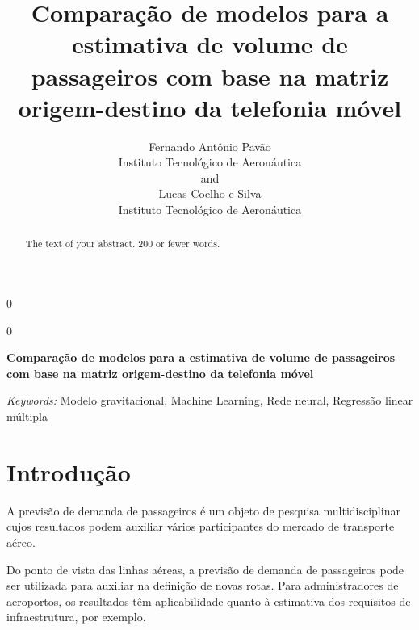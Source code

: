 \documentclass[12pt]{article}
\newcommand{\blind}{0}
\begin{document}
\def\spacingset#1{\renewcommand{\baselinestretch}%
{#1}\small\normalsize} \spacingset{1}



\blind
{
  \title{\bf Comparação de modelos para a estimativa de volume de passageiros com
base na matriz origem-destino da telefonia móvel}

  \author{
        Fernando Antônio Pavão \\
    Instituto Tecnológico de Aeronáutica\\
     and \\     Lucas Coelho e Silva \\
    Instituto Tecnológico de Aeronáutica\\
      }
  \maketitle
} \fi

\blind
{
  \bigskip
  \bigskip
  \bigskip
  \begin{center}
    {\LARGE\bf Comparação de modelos para a estimativa de volume de passageiros com
base na matriz origem-destino da telefonia móvel}
  \end{center}
  \medskip
} \fi

\bigskip
\begin{abstract}
The text of your abstract. 200 or fewer words.
\end{abstract}

\noindent%
{\it Keywords:} Modelo gravitacional, Machine Learning, Rede neural, Regressão linear múltipla
\vfill

\newpage
\spacingset{1.45} %

\hypertarget{introduuxe7uxe3o}{%
\section{Introdução}\label{introduuxe7uxe3o}}

A previsão de demanda de passageiros é um objeto de pesquisa
multidisciplinar cujos resultados podem auxiliar vários participantes do
mercado de transporte aéreo.

Do ponto de vista das linhas aéreas, a previsão de demanda de
passageiros pode ser utilizada para auxiliar na definição de novas
rotas. Para administradores de aeroportos, os resultados têm
aplicabilidade quanto à estimativa dos requisitos de infraestrutura, por
exemplo.
\end{document}
